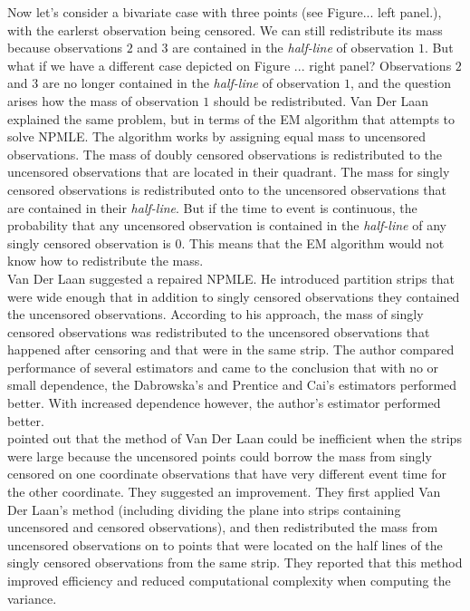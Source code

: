 \documentclass[]{article}
\begin{document}
Now let's consider a bivariate case with three points (see Figure... left panel.), with the earlerst observation being censored. We can still redistribute its mass because observations $2$ and $3$ are contained in the \emph{half-line} of observation $1$. But what if we have a different case depicted on Figure ... right panel? Observations $2$ and $3$ are no longer contained in the \emph{half-line} of observation $1$, and the question arises how the mass of observation $1$ should be redistributed. Van Der Laan explained the same problem, but in terms of the EM algorithm that attempts to solve NPMLE. The algorithm works by assigning equal mass to uncensored observations. The mass of doubly censored observations is redistributed to the uncensored observations that are located in their quadrant. The mass for singly censored observations is redistributed onto to the uncensored observations that are contained in their \emph{half-line}. But if the time to event is continuous, the probability that any uncensored observation is contained in the \emph{half-line} of any singly censored observation is $0$. This means that the EM algorithm would not know how to redistribute the mass.\\

Van Der Laan suggested a repaired NPMLE. He introduced partition strips that were wide enough that in addition to singly censored observations they contained the uncensored observations. According to his approach, the mass of singly censored observations was redistributed to the uncensored observations that happened after censoring and that were in the same strip. The author compared performance of several estimators and came to the conclusion that with no or small dependence, the Dabrowska's and Prentice and Cai's estimators performed better. With increased dependence however, the author's estimator performed better.\\

\cite{moodie2005adjustment} pointed out that the method of Van Der Laan could be inefficient when the strips were large because the uncensored points could borrow the mass from singly censored on one coordinate observations that have very different event time for the other coordinate. They suggested an improvement. They first applied Van Der Laan's method (including dividing the plane into strips containing uncensored and censored observations), and then redistributed the mass from uncensored observations on to points that were located on the half lines of the singly censored observations from the same strip. They reported that this method improved efficiency and reduced computational complexity when computing the variance.
\end{document}
